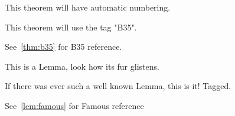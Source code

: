 \documentclass{article}
\begin{document}
    \begin{theorem}
        This theorem will have automatic numbering.
    \end{theorem}

    \begin{theorem}[B35]\label{thm:b35}
        This theorem will use the tag "B35".
    \end{theorem}

    See~\cref{thm:b35} for B35 reference.

    \begin{lemma}
        This is a Lemma, look how its fur glistens.
    \end{lemma}

    \begin{lemma}[Famous]\label{lem:famous}
        If there was ever such a well known Lemma, this is it! Tagged.
    \end{lemma}

    See~\cref{lem:famous} for Famous reference
\end{document}
